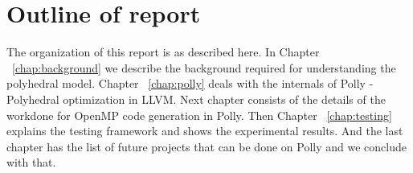 \section{Outline of report}
The organization of this report is as described here. In Chapter ~\ref{chap:background} we
describe the background required for understanding the polyhedral model. Chapter ~\ref{chap:polly}
deals with the internals of Polly - Polyhedral optimization in LLVM. Next chapter consists of
the details of the workdone for OpenMP code generation in Polly. Then  Chapter ~\ref{chap:testing}
explains the testing framework and shows the experimental results. And the last chapter
has the list of future projects that can be done on Polly and we conclude with that.

